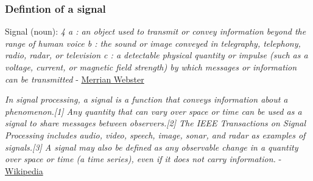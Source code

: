 \documentclass[fleqn]{beamer} %
\begin{document}
			\begin{frame}
				\frametitle{Defintion of a signal} {\footnotesize
				Signal (noun):
				{\it 4 a : an object used to transmit or convey information beyond the range of human voice 
				  	 b : the sound or image conveyed in telegraphy, telephony, radio, radar, or television 
				  	 c : a detectable physical quantity or impulse (such as a voltage, current, or magnetic field strength) by which messages or information can be transmitted } - \href{https://www.merriam-webster.com/dictionary/signal}{Merrian Webster} \vspace{3mm}

				{\it  	 In signal processing, a signal is a function that conveys information about a phenomenon.[1] Any quantity that can vary over space or time can be used as a signal to share messages between observers.[2] The IEEE Transactions on Signal Processing includes audio, video, speech, image, sonar, and radar as examples of signals.[3] A signal may also be defined as any observable change in a quantity over space or time (a time series), even if it does not carry information.} - \href{https://en.wikipedia.org/wiki/Signal}{Wikipedia}
				}  	 	
			\end{frame}
\end{document}
